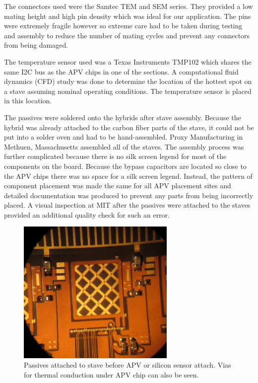 \documentclass[preprint,12pt]{elsarticle}
\begin{document}
The connectors used were the Samtec TEM and SEM series. They provided a low
mating height and high pin density which was ideal for our application. The
pins were extremely fragile however so extreme care had to be taken during
testing and assembly to reduce the number of mating cycles and prevent any
connectors from being damaged.

The temperature sensor used was a Texas Instruments TMP102 which shares the same
I2C bus as the APV chips in one of the sections. A computational fluid dynamics (CFD) study was done to
determine the location of the hottest spot on a stave assuming nominal operating
conditions. The temperature sensor is placed in this location.

The passives were soldered onto the hybrids after stave assembly. Because the
hybrid was already attached to the carbon fiber parts of the stave, it
could not be put into a solder oven and had to be hand-assembled. Proxy
Manufacturing in Methuen, Massachusetts assembled all of the staves. The
assembly process was further complicated because there is no silk screen
legend for most of the components on the board. Because the bypass capacitors
are located so close to the APV chips there was no space for a silk screen
legend. Instead, the pattern of component placement was made the same for all
APV placement sites and detailed documentation was produced to prevent any parts
from being incorrectly placed. A visual inspection at MIT after the
passives were attached to the staves provided an additional quality check for
such an error.

\begin{figure}[h]
\begin{center}
\includegraphics[width=3in, keepaspectratio=true, angle=0]{graphics/passive.jpg}
\caption{Passives attached to stave before APV or silicon sensor attach.  Vias
for thermal conduction under APV chip can also be seen.
\label{fig:passive}}
\end{center}
\end{figure}
\end{document}
